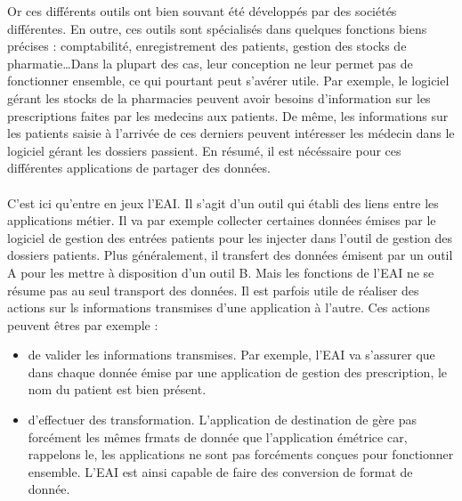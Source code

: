			\begin{tableau} %
			\end{tableau}
			
			Or ces différents outils ont bien souvant été développés par des sociétés
			différentes. En outre, ces outils sont spécialisés dans quelques fonctions
			biens précises : comptabilité, enregistrement des patients, gestion des
			stocks de pharmatie\ldots Dans la plupart des cas, leur conception ne leur
			permet pas de fonctionner ensemble, ce qui pourtant peut s'avérer utile. Par
			exemple, le logiciel gérant les stocks de la pharmacies peuvent avoir besoins
			d'information sur les prescriptions faites par les medecins aux patients. De
			même, les informations sur les patients saisie à l'arrivée de ces derniers
			peuvent intéresser les médecin dans le logiciel gérant les dossiers passient.
			En résumé, il est nécéssaire pour ces différentes applications de partager
			des données.
		
			\paragraph{}%
			C'est ici qu'entre en jeux l'EAI. Il s'agit d'un outil qui établi des liens
			entre les applications métier. Il va par exemple collecter certaines données
			émises par le logiciel de gestion des entrées patients pour les injecter dans
			l'outil de gestion des dossiers patients. Plus généralement, il transfert des données
			émisent par un outil A pour les mettre à disposition d'un outil B.\newline
			Mais les fonctions de l'EAI ne se résume pas au seul transport des
			données. Il est parfois utile de réaliser des actions sur ls informations
			transmises d'une application à l'autre. Ces actions peuvent êtres par exemple
			:\newline
			\begin{itemize}
			  \item de valider les informations transmises. Par exemple, l'EAI va
			  s'assurer que dans chaque donnée émise par une application de gestion des
			  prescription, le nom du patient est bien présent.
			  \item d'effectuer des transformation. L'application de destination de
			  gère pas forcément les mêmes frmats de donnée que l'application émétrice
			  car, rappelons le, les applications ne sont pas forcéments conçues pour
			  fonctionner ensemble. L'EAI est ainsi capable de faire des conversion de
			  format de donnée.
			\end{itemize}

